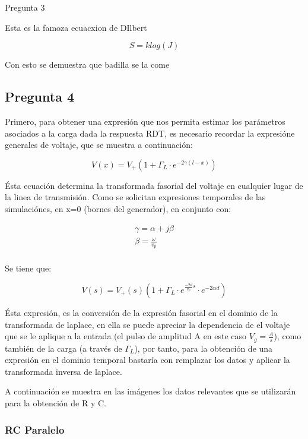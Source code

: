 \documentclass[11pt,onecolumn]{article}
\begin{document}
Pregunta 3

Esta es la famoza ecuacxion de DIlbert

	$$S = k log(J)$$
	
Con esto se demuestra que badilla se la come






\subsection{Pregunta 4}

Primero, para obtener una expresión que nos permita estimar  los parámetros asociados a la carga dada la respuesta RDT, es necesario recordar la expresióne generales de voltaje, que se muestra a continuación:

\[
V(x) = V_ +  \left( {1 + \Gamma _L  \cdot e{}^{ - 2\gamma (l - x)}} \right)
\]

Ésta ecuación determina la transformada fasorial del voltaje en cualquier lugar de la linea de transmisión. Como se solicitan expresiones temporales de las simulaciónes, en x=0 (bornes del generador), en conjunto con:

\[
\begin{array}{l}
 \gamma  = \alpha  + j\beta  \\ 
 \beta  = \frac{\omega }{{v_p }} \\ 
 \end{array}
\]

Se tiene que:

\[
V(s) = V_ +  (s)\left( {1 + \Gamma _L  \cdot e^{\frac{{ - 2d}}{{v_p }}s} \cdot e^{ - 2\alpha d}} \right)
\]

Ésta expresión, es la conversión de la expresión fasorial en el dominio de la transformada de laplace, en ella se puede apreciar la dependencia de el voltaje que se le aplique a la entrada (el pulso de amplitud A en este caso $V_g=\frac{A}{s}$), como también de la carga (a través de $\Gamma_L$), por tanto, para la obtención de una expresión en el dominio temporal bastaría con remplazar los datos y aplicar la transformada inversa de laplace.


A continuación se muestra en las imágenes los datos relevantes que se utilizarán para la obtención de R y C.


\subsubsection{RC Paralelo}
\end{document}
